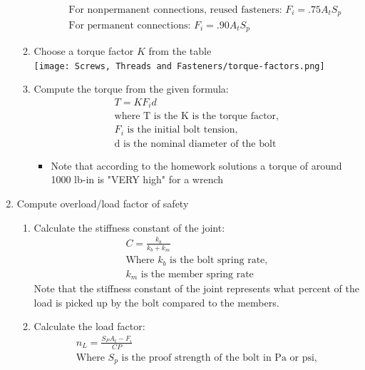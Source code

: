 \documentclass[11pt, fleqn]{article}
\begin{document}
\begin{enumerate}
\begin{enumerate}
\begin{itemize}
                    \begin{align*}
                        \text{For nonpermanent connections, reused fasteners: } F_i = .75A_tS_p\\
                        \text{For permanent connections: } F_i = .90A_tS_p
                    \end{align*}
            \end{itemize}
            \item Choose a torque factor $K$ from the table\\
            \texttt{[image: Screws, Threads and Fasteners/torque-factors.png]}
            \item Compute the torque from the given formula:
            \begin{align*}
                T = KF_id\\
                \text{where T is the K is the torque factor,}\\
                \text{$F_i$ is the initial bolt tension,}\\
                \text{d is the nominal diameter of the bolt}
            \end{align*}
            \begin{itemize}
            \item Note that according to the homework solutions a torque of around 1000 lb-in is "VERY high" for a wrench
            \end{itemize}
        \end{enumerate}
        \item Compute overload/load factor of safety
        \begin{enumerate}
            \item Calculate the stiffness constant of the joint:
            \begin{align*}
                C = \frac{k_b}{k_b+k_m}\\
                \text{Where $k_b$ is the bolt spring rate,}\\
                \text{$k_m$ is the member spring rate}
            \end{align*}
            Note that the stiffness constant of the joint represents what percent of the load is picked up by the bolt compared to the members.
            \item Calculate the load factor:
            \begin{align*}
            n_L = \frac{S_PA_t-F_i}{CP}\\
            \text{Where $S_p$ is the proof strength of the bolt in Pa or psi,}\\

\end{align*}
\end{enumerate}
\end{enumerate}
\end{document}
